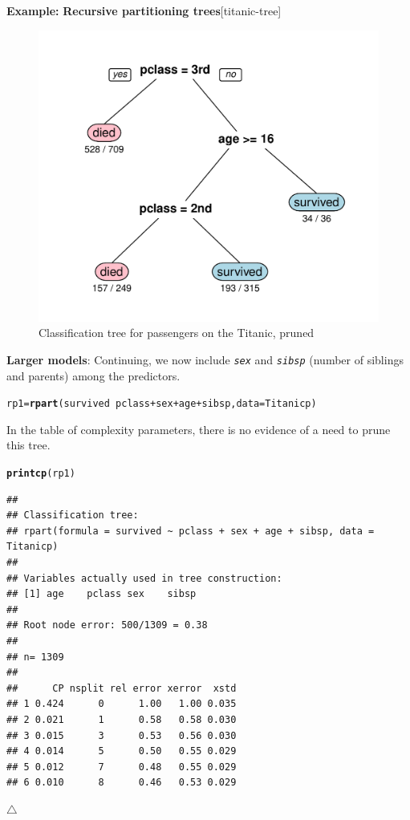 \documentclass{article}
\makeatletter
\newcommand{\hlopt}[1]{\textcolor[rgb]{0,0,0}{#1}}%
\newcommand{\hlstd}[1]{\textcolor[rgb]{0.345,0.345,0.345}{#1}}%
\newcommand{\hlkwb}[1]{\textcolor[rgb]{0.69,0.353,0.396}{#1}}%
\newcommand{\hlkwc}[1]{\textcolor[rgb]{0.333,0.667,0.333}{#1}}%
\newcommand{\hlkwd}[1]{\textcolor[rgb]{0.737,0.353,0.396}{\textbf{#1}}}%
\newenvironment{kframe}{%
 \def\at@end@of@kframe{}%
 \ifinner\ifhmode%
  \def\at@end@of@kframe{\end{minipage}}%
  \begin{minipage}{\columnwidth}%
 \fi\fi%
 \def\FrameCommand##1{\hskip\@totalleftmargin \hskip-\fboxsep
 \colorbox{shadecolor}{##1}\hskip-\fboxsep
     \hskip-\linewidth \hskip-\@totalleftmargin \hskip\columnwidth}%
 \MakeFramed {\advance\hsize-\width
   \@totalleftmargin\z@ \linewidth\hsize
   \@setminipage}}%
 {\par\unskip\endMakeFramed%
 \at@end@of@kframe}
\newenvironment{knitrout}{}{} %
\newcommand{\var}[1]{\textit{\texttt{#1}}}
\newenvironment{Example}[2][unnamed-example]%
  {\medskip\noindent\textbf{\textsf{Example:}}
   \textbf{#2}\hfill [#1]\par\smallskip
  }
  {\hfill $\triangle$}
\makeatother
\begin{document}
\begin{Example}[titanic-tree]{Recursive partitioning trees}
\begin{knitrout}
\begin{figure}[hbt!]
{\centering \includegraphics[width=0.6\linewidth]{figure/rp0-pruned} 

}

\caption[Classification tree for passengers on the Titanic, pruned]{Classification tree for passengers on the Titanic, pruned\label{fig:rp0-pruned}}
\end{figure}


\end{knitrout}


\noindent\textbf{Larger models}:
Continuing, we now include \var{sex} and \var{sibsp} 
(number of siblings and parents)
among the predictors.  
\begin{knitrout}
\color{fgcolor}\begin{kframe}
\begin{alltt}
\hlstd{rp1} \hlkwb{=} \hlkwd{rpart}\hlstd{(survived} \hlopt{~} \hlstd{pclass} \hlopt{+} \hlstd{sex} \hlopt{+} \hlstd{age} \hlopt{+} \hlstd{sibsp,} \hlkwc{data}\hlstd{=Titanicp)}
\end{alltt}
\end{kframe}
\end{knitrout}

In the table of complexity parameters, there is no evidence of a need to prune this
tree.
\begin{knitrout}
\color{fgcolor}\begin{kframe}
\begin{alltt}
\hlkwd{printcp}\hlstd{(rp1)}
\end{alltt}
\begin{verbatim}
## 
## Classification tree:
## rpart(formula = survived ~ pclass + sex + age + sibsp, data = Titanicp)
## 
## Variables actually used in tree construction:
## [1] age    pclass sex    sibsp 
## 
## Root node error: 500/1309 = 0.38
## 
## n= 1309 
## 
##      CP nsplit rel error xerror  xstd
## 1 0.424      0      1.00   1.00 0.035
## 2 0.021      1      0.58   0.58 0.030
## 3 0.015      3      0.53   0.56 0.030
## 4 0.014      5      0.50   0.55 0.029
## 5 0.012      7      0.48   0.55 0.029
## 6 0.010      8      0.46   0.53 0.029
\end{verbatim}
\end{kframe}
\end{knitrout}



\end{Example}
\end{document}
